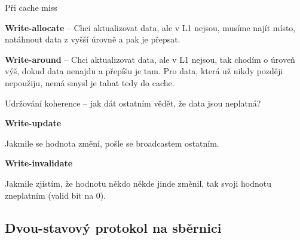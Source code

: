 \begin{compactitem}
\begin{compactitem}
        \item Při cache miss \begin{compactitem}
            \item \textbf{Write-allocate} -- Chci aktualizovat data, ale v L1 nejsou, musíme najít místo, natáhnout data z vyšší úrovně a pak je přepsat.
            \item \textbf{Write-around} -- Chci aktualizovat data, ale v L1 nejsou, tak chodím o úroveň výš, dokud data nenajdu a přepíšu je tam. Pro data, která už nikdy později nepoužiju, nemá smysl je tahat tedy do cache.
        \end{compactitem}
    \end{compactitem}

    \item Udržování koherence -- jak dát ostatním vědět, že data jsou neplatná?\begin{compactitem}
        \item \textbf{Write-update} \begin{compactitem}
            \item Jakmile se hodnota změní, pošle se broadcastem ostatním.
        \end{compactitem}
        \item \textbf{Write-invalidate} \begin{compactitem}
            \item Jakmile zjistím, že hodnotu někdo někde jinde změnil, tak svoji hodnotu zneplatním (valid bit na 0).
        \end{compactitem}
    \end{compactitem}
\end{compactitem}

\subsection{Dvou-stavový protokol na sběrnici}

